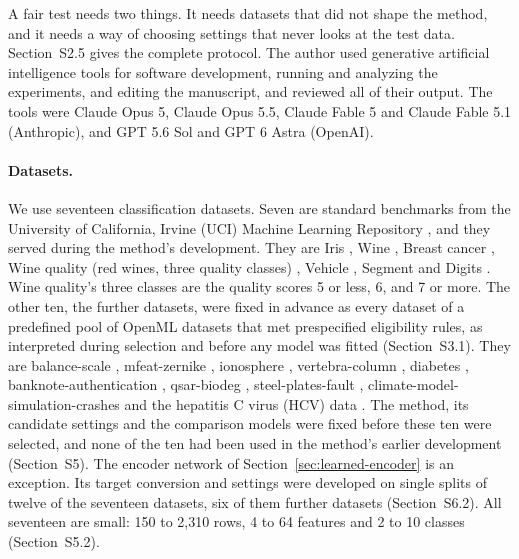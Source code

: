 A fair test needs two things. It needs datasets that did not shape the method, and it needs a way of choosing settings that never looks at the test data. Section~S2.5 gives the complete protocol. The author used generative artificial intelligence tools for software development, running and analyzing the experiments, and editing the manuscript, and reviewed all of their output. The tools were Claude Opus 5, Claude Opus 5.5, Claude Fable 5 and Claude Fable 5.1 (Anthropic), and GPT 5.6 Sol and GPT 6 Astra (OpenAI).

\paragraph{Datasets.} We use seventeen classification datasets. Seven are standard benchmarks from the University of California, Irvine (UCI) Machine Learning Repository \citep{dua2019uci}, and they served during the method's development. They are Iris \citep{uci_iris}, Wine \citep{uci_wine}, Breast cancer \citep{uci_wdbc}, Wine quality (red wines, three quality classes) \citep{uci_winequality}, Vehicle \citep{uci_vehicle}, Segment \citep{uci_segment} and Digits \citep{uci_digits}. Wine quality's three classes are the quality scores 5 or less, 6, and 7 or more. The other ten, the further datasets, were fixed in advance as every dataset of a predefined pool of OpenML datasets \citep{vanschoren2014openml,bischl2021openml} that met prespecified eligibility rules, as interpreted during selection and before any model was fitted (Section~S3.1). They are balance-scale \citep{uci_balance}, mfeat-zernike \citep{uci_mfeat}, ionosphere \citep{uci_ionosphere}, vertebra-column \citep{uci_vertebral}, diabetes \citep{smith1988diabetes}, banknote-authentication \citep{uci_banknote}, qsar-biodeg \citep{uci_qsar}, steel-plates-fault \citep{uci_steel}, climate-model-simulation-crashes \citep{uci_climate} and the hepatitis C virus (HCV) data \citep{uci_hcv}. The method, its candidate settings and the comparison models were fixed before these ten were selected, and none of the ten had been used in the method's earlier development (Section~S5). The encoder network of Section~\ref{sec:learned-encoder} is an exception. Its target conversion and settings were developed on single splits of twelve of the seventeen datasets, six of them further datasets (Section~S6.2). All seventeen are small: 150 to 2,310 rows, 4 to 64 features and 2 to 10 classes (Section~S5.2).

